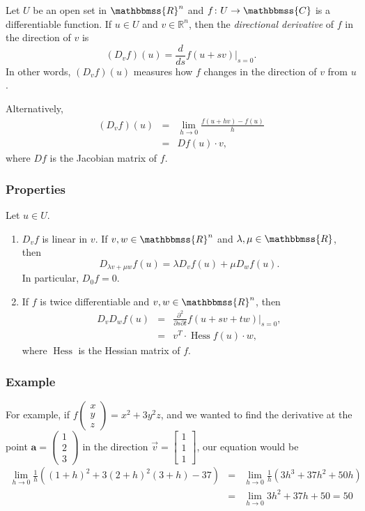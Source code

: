 \documentclass{article}
\newcommand{\sR}[0]{\mathbb{R}}
\newcommand{\C}{\mathbbmss{C}}
\newcommand{\R}{\mathbbmss{R}}
\begin{document}
Let $U$ be an open set in $\R^n$ and $f\colon U\to \C$ is a differentiable
function. If $u\in U$ and $v\in \sR^n$, then the 
\emph{directional derivative} of $f$ in the direction of $v$ is
$$
  (D_v f)(u) = \frac{d}{ds} f(u+sv) \Big|_{s=0}.
$$
In other words, $(D_v f)(u)$ measures how $f$ changes in the direction of $v$
from $u$. 

Alternatively, 
\begin{eqnarray*}
 (D_v f)(u) &=& \lim_{h\to 0} \frac{ f(u+ hv) - f(u)}{h} \\
   &=& Df(u)\cdot v,
\end{eqnarray*}
where $Df$ is the Jacobian matrix of $f$.

\subsubsection*{Properties}
Let $u\in U$. 
\begin{enumerate}
\item $D_v f$ is linear in $v$. If $v, w\in \R^n$ and $\lambda, \mu \in \R$, 
then 
$$
   D_{\lambda v+\mu w}f(u) =    \lambda D_{v}f(u) +\mu D_{w}f(u).
$$
In particular, $D_0 f=0$.
\item If $f$ is twice differentiable and $v,w\in \R^n$, then 
\begin{eqnarray*}
   D_v D_w f(u) &=& \frac{\partial^2}{\partial s\partial t} f(u+sv + tw) \Big|_{s=0}, \\
     &=& v^T\cdot \operatorname{Hess}f(u)\cdot w,
\end{eqnarray*}
where $\operatorname{Hess}$ is the Hessian matrix of $f$. 
\end{enumerate}

\subsubsection*{Example}
For example, if $f\left(\begin{array}{c}x\\y\\z\end{array}\right) = x^2 + 3y^2z$, and we wanted to find the derivative at the point $\mathbf{a}=\left(\begin{array}{c}1\\2\\3\end{array}\right)$ in the direction $\vec{v}=\left[\begin{array}{c}1\\1\\1\end{array}\right]$, our equation would be
\begin{eqnarray*}
\lim_{h\rightarrow 0}\frac{1}{h}\left((1+h)^2 + 3(2+h)^2(3+h) - 37\right)
&=&\lim_{h\rightarrow 0}\frac{1}{h}(3h^3+37h^2+50h)\\
&=&\lim_{h\rightarrow 0}3h^2+37h +50 = 50\end{eqnarray*}
\end{document}
